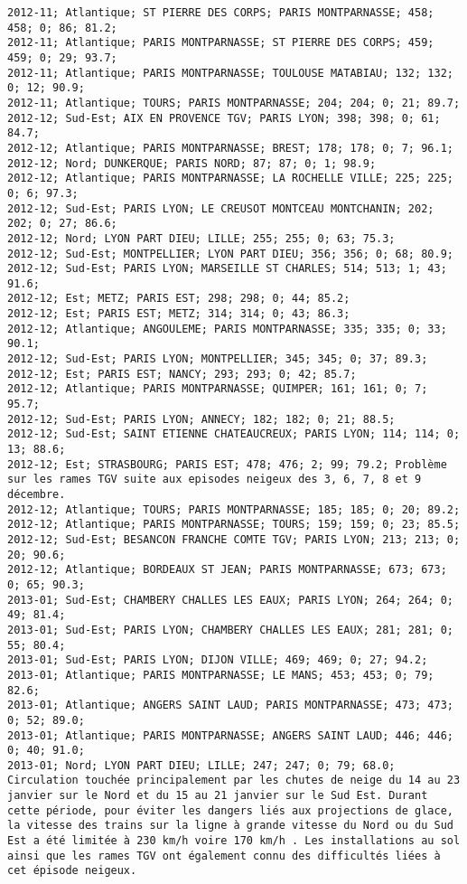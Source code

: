 \documentclass{article}
\begin{document}
\begin{Verbatim}[commandchars=\\\{\}]
2012-11; Atlantique; ST PIERRE DES CORPS; PARIS MONTPARNASSE; 458; 458; 0; 86; 81.2; 
2012-11; Atlantique; PARIS MONTPARNASSE; ST PIERRE DES CORPS; 459; 459; 0; 29; 93.7; 
2012-11; Atlantique; PARIS MONTPARNASSE; TOULOUSE MATABIAU; 132; 132; 0; 12; 90.9; 
2012-11; Atlantique; TOURS; PARIS MONTPARNASSE; 204; 204; 0; 21; 89.7; 
2012-12; Sud-Est; AIX EN PROVENCE TGV; PARIS LYON; 398; 398; 0; 61; 84.7; 
2012-12; Atlantique; PARIS MONTPARNASSE; BREST; 178; 178; 0; 7; 96.1; 
2012-12; Nord; DUNKERQUE; PARIS NORD; 87; 87; 0; 1; 98.9; 
2012-12; Atlantique; PARIS MONTPARNASSE; LA ROCHELLE VILLE; 225; 225; 0; 6; 97.3; 
2012-12; Sud-Est; PARIS LYON; LE CREUSOT MONTCEAU MONTCHANIN; 202; 202; 0; 27; 86.6; 
2012-12; Nord; LYON PART DIEU; LILLE; 255; 255; 0; 63; 75.3; 
2012-12; Sud-Est; MONTPELLIER; LYON PART DIEU; 356; 356; 0; 68; 80.9; 
2012-12; Sud-Est; PARIS LYON; MARSEILLE ST CHARLES; 514; 513; 1; 43; 91.6; 
2012-12; Est; METZ; PARIS EST; 298; 298; 0; 44; 85.2; 
2012-12; Est; PARIS EST; METZ; 314; 314; 0; 43; 86.3; 
2012-12; Atlantique; ANGOULEME; PARIS MONTPARNASSE; 335; 335; 0; 33; 90.1; 
2012-12; Sud-Est; PARIS LYON; MONTPELLIER; 345; 345; 0; 37; 89.3; 
2012-12; Est; PARIS EST; NANCY; 293; 293; 0; 42; 85.7; 
2012-12; Atlantique; PARIS MONTPARNASSE; QUIMPER; 161; 161; 0; 7; 95.7; 
2012-12; Sud-Est; PARIS LYON; ANNECY; 182; 182; 0; 21; 88.5; 
2012-12; Sud-Est; SAINT ETIENNE CHATEAUCREUX; PARIS LYON; 114; 114; 0; 13; 88.6; 
2012-12; Est; STRASBOURG; PARIS EST; 478; 476; 2; 99; 79.2; Problème sur les rames TGV suite aux episodes neigeux des 3, 6, 7, 8 et 9 décembre.
2012-12; Atlantique; TOURS; PARIS MONTPARNASSE; 185; 185; 0; 20; 89.2; 
2012-12; Atlantique; PARIS MONTPARNASSE; TOURS; 159; 159; 0; 23; 85.5; 
2012-12; Sud-Est; BESANCON FRANCHE COMTE TGV; PARIS LYON; 213; 213; 0; 20; 90.6; 
2012-12; Atlantique; BORDEAUX ST JEAN; PARIS MONTPARNASSE; 673; 673; 0; 65; 90.3; 
2013-01; Sud-Est; CHAMBERY CHALLES LES EAUX; PARIS LYON; 264; 264; 0; 49; 81.4; 
2013-01; Sud-Est; PARIS LYON; CHAMBERY CHALLES LES EAUX; 281; 281; 0; 55; 80.4; 
2013-01; Sud-Est; PARIS LYON; DIJON VILLE; 469; 469; 0; 27; 94.2; 
2013-01; Atlantique; PARIS MONTPARNASSE; LE MANS; 453; 453; 0; 79; 82.6; 
2013-01; Atlantique; ANGERS SAINT LAUD; PARIS MONTPARNASSE; 473; 473; 0; 52; 89.0; 
2013-01; Atlantique; PARIS MONTPARNASSE; ANGERS SAINT LAUD; 446; 446; 0; 40; 91.0; 
2013-01; Nord; LYON PART DIEU; LILLE; 247; 247; 0; 79; 68.0; Circulation touchée principalement par les chutes de neige du 14 au 23 janvier sur le Nord et du 15 au 21 janvier sur le Sud Est. Durant cette période, pour éviter les dangers liés aux projections de glace, la vitesse des trains sur la ligne à grande vitesse du Nord ou du Sud Est a été limitée à 230 km/h voire 170 km/h . Les installations au sol ainsi que les rames TGV ont également connu des difficultés liées à cet épisode neigeux.

\end{Verbatim}
\end{document}
